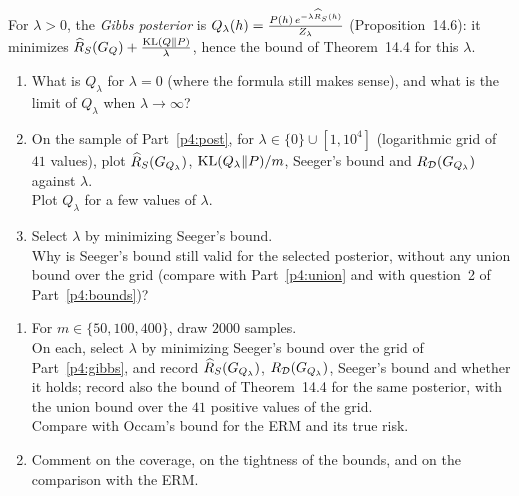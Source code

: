 \documentclass[a4paper,11pt]{article}
\begin{document}
\label{p4:gibbs}

For $\lambda>0$, the \emph{Gibbs posterior} is $Q_\lambda(h)=\frac{P(h)\,e^{-\lambda\widehat{R}_{S}(h)}}{Z_\lambda}$
(Proposition~14.6): it minimizes $\widehat{R}_{S}(G_{Q})+\frac{\operatorname{KL}(Q\|P)}{\lambda}$, hence the bound of Theorem~14.4 for this $\lambda$.

\begin{enumerate}
\item What is $Q_\lambda$ for $\lambda=0$ (where the formula still makes sense), and what is the limit of $Q_\lambda$ when $\lambda\to\infty$?
\item On the sample of Part~\ref{p4:post}, for $\lambda\in\{0\}\cup[1,10^4]$ (logarithmic grid of $41$ values), plot
      $\widehat{R}_{S}(G_{Q_\lambda})$, $\operatorname{KL}(Q_\lambda\|P)/m$, Seeger's bound and $R_{\mathcal{D}}(G_{Q_\lambda})$ against $\lambda$.\\
      Plot $Q_\lambda$ for a few values of $\lambda$.
\item Select $\lambda$ by minimizing Seeger's bound.\\
      Why is Seeger's bound still valid for the selected posterior, without any union bound over the grid (compare with
      Part~\ref{p4:union} and with question~2 of Part~\ref{p4:bounds})?
\end{enumerate}

\label{p4:check}

\begin{enumerate}
\item For $m\in\{50,100,400\}$, draw $2000$ samples.\\
      On each, select $\lambda$ by minimizing Seeger's bound over the grid of Part~\ref{p4:gibbs}, and record
      $\widehat{R}_{S}(G_{Q_\lambda})$, $R_{\mathcal{D}}(G_{Q_\lambda})$, Seeger's bound and whether it holds; record also the bound of
      Theorem~14.4 for the same posterior, with the union bound over the $41$ positive values of the grid.\\
      Compare with Occam's bound for the ERM and its true risk.
\item Comment on the coverage, on the tightness of the bounds, and on the comparison with the ERM.
\end{enumerate}

\label{p4:far}
\end{document}
